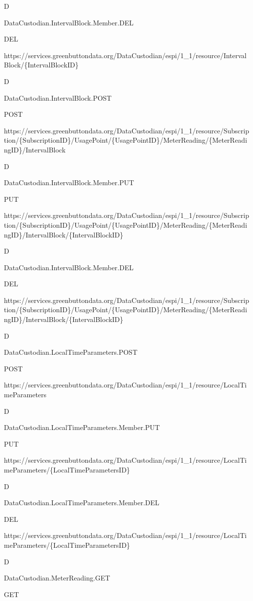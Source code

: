 \documentclass[a4paper,12pt,single,pdftex]{scrbook}
\begin{document}
D

DataCustodian.IntervalBlock.Member.DEL

DEL

https://services.greenbuttondata.org/DataCustodian/espi/1\_1/resource/IntervalBlock/\{IntervalBlockID\}

D

DataCustodian.IntervalBlock.POST

POST

https://services.greenbuttondata.org/DataCustodian/espi/1\_1/resource/Subscription/\{SubscriptionID\}/UsagePoint/\{UsagePointID\}/MeterReading/\{MeterReadingID\}/IntervalBlock

D

DataCustodian.IntervalBlock.Member.PUT

PUT

https://services.greenbuttondata.org/DataCustodian/espi/1\_1/resource/Subscription/\{SubscriptionID\}/UsagePoint/\{UsagePointID\}/MeterReading/\{MeterReadingID\}/IntervalBlock/\{IntervalBlockID\}

D

DataCustodian.IntervalBlock.Member.DEL

DEL

https://services.greenbuttondata.org/DataCustodian/espi/1\_1/resource/Subscription/\{SubscriptionID\}/UsagePoint/\{UsagePointID\}/MeterReading/\{MeterReadingID\}/IntervalBlock/\{IntervalBlockID\}

D

DataCustodian.LocalTimeParameters.POST

POST

https://services.greenbuttondata.org/DataCustodian/espi/1\_1/resource/LocalTimeParameters

D

DataCustodian.LocalTimeParameters.Member.PUT

PUT

https://services.greenbuttondata.org/DataCustodian/espi/1\_1/resource/LocalTimeParameters/\{LocalTimeParametersID\}

D

DataCustodian.LocalTimeParameters.Member.DEL

DEL

https://services.greenbuttondata.org/DataCustodian/espi/1\_1/resource/LocalTimeParameters/\{LocalTimeParametersID\}

D

DataCustodian.MeterReading.GET

GET
\end{document}
